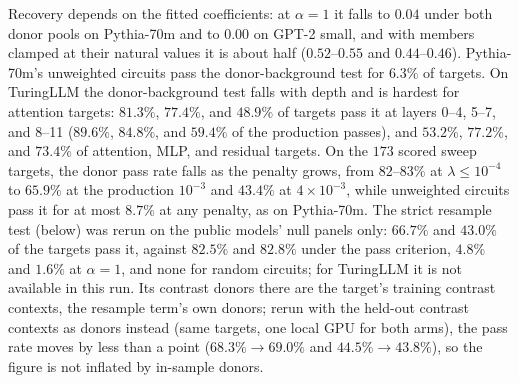 \documentclass[10pt]{article}
\begin{document}
Recovery depends on the fitted coefficients: at $\alpha = 1$ it falls to $0.04$ under both donor pools on Pythia-70m and to $0.00$ on GPT-2 small, and with members clamped at their natural values it is about half ($0.52$--$0.55$ and $0.44$--$0.46$).
Pythia-70m's unweighted circuits pass the donor-background test for $6.3\%$ of targets.
On TuringLLM the donor-background test falls with depth and is hardest for attention targets: $81.3\%$, $77.4\%$, and $48.9\%$ of targets pass it at layers 0--4, 5--7, and 8--11 ($89.6\%$, $84.8\%$, and $59.4\%$ of the production passes), and $53.2\%$, $77.2\%$, and $73.4\%$ of attention, MLP, and residual targets.
On the $173$ scored sweep targets, the donor pass rate falls as the penalty grows, from $82$--$83\%$ at $\lambda \le 10^{-4}$ to $65.9\%$ at the production $10^{-3}$ and $43.4\%$ at $4 \times 10^{-3}$, while unweighted circuits pass it for at most $8.7\%$ at any penalty, as on Pythia-70m.
The strict resample test (below) was rerun on the public models' null panels only: $66.7\%$ and $43.0\%$ of the targets pass it, against $82.5\%$ and $82.8\%$ under the pass criterion, $4.8\%$ and $1.6\%$ at $\alpha = 1$, and none for random circuits; for TuringLLM it is not available in this run.
Its contrast donors there are the target's training contrast contexts, the resample term's own donors; rerun with the held-out contrast contexts as donors instead (same targets, one local GPU for both arms), the pass rate moves by less than a point ($68.3\% \to 69.0\%$ and $44.5\% \to 43.8\%$), so the figure is not inflated by in-sample donors.
\end{document}

